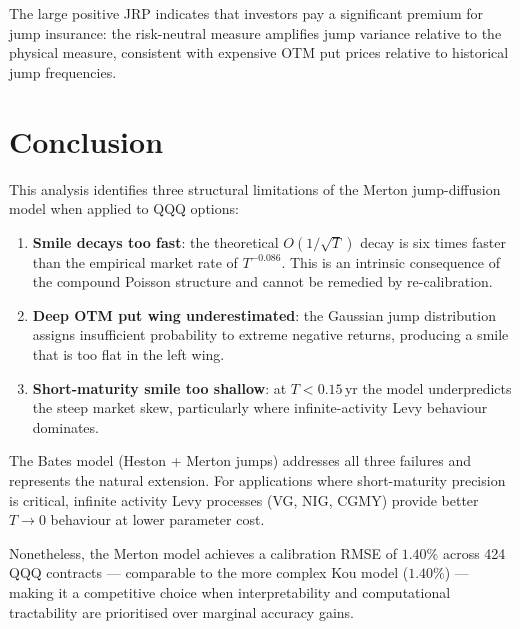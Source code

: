 \documentclass[12pt, a4paper]{article}
\begin{document}
The large positive JRP indicates that investors pay a significant premium for
jump insurance: the risk-neutral measure amplifies jump variance relative to
the physical measure, consistent with expensive OTM put prices relative to
historical jump frequencies.

\section{Conclusion}

This analysis identifies three structural limitations of the Merton
jump-diffusion model when applied to QQQ options:

\begin{enumerate}
    \item \textbf{Smile decays too fast}: the theoretical $O(1/\sqrt{T})$
    decay is six times faster than the empirical market rate of $T^{-0.086}$.
    This is an intrinsic consequence of the compound Poisson structure and
    cannot be remedied by re-calibration.

    \item \textbf{Deep OTM put wing underestimated}: the Gaussian jump
    distribution assigns insufficient probability to extreme negative returns,
    producing a smile that is too flat in the left wing.

    \item \textbf{Short-maturity smile too shallow}: at $T < 0.15$\,yr the
    model underpredicts the steep market skew, particularly where
    infinite-activity Levy behaviour dominates.
\end{enumerate}

The Bates model (Heston + Merton jumps) addresses all three failures and
represents the natural extension. For applications where short-maturity
precision is critical, infinite activity Levy processes (VG, NIG, CGMY)
provide better $T \to 0$ behaviour at lower parameter cost.

Nonetheless, the Merton model achieves a calibration RMSE of $1.40\%$ across
424 QQQ contracts --- comparable to the more complex Kou model ($1.40\%$) ---
making it a competitive choice when interpretability and computational
tractability are prioritised over marginal accuracy gains.
\end{document}
